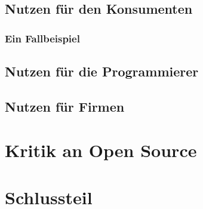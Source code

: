 \documentclass[a4paper,12pt]{article}
\begin{document}
\subsection{Nutzen für den Konsumenten}
\subsubsection{Ein Fallbeispiel}
\subsection{Nutzen für die Programmierer}
\subsection{Nutzen für Firmen}
\section{Kritik an Open Source}
\section{Schlussteil}
\newpage
{}
\end{document}
